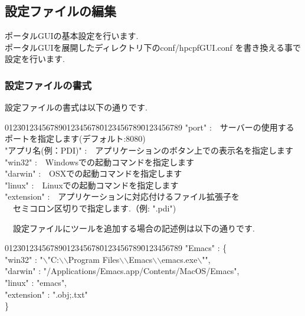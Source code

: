 \documentclass[a4paper,10pt,oneside]{jsbook}
\begin{document}
\newpage

\subsection{設定ファイルの編集}
\label{sec:editconfig}
ポータルGUIの基本設定を行います.\\
ポータルGUIを展開したディレクトリ下のconf/hpcpfGUI.conf
を書き換える事で設定を行います.\\

\subsubsection{設定ファイルの書式}
設定ファイルの書式は以下の通りです.
\label{sec:editconfig_format}
\begin{tabbing}
0123\=0123456789012345678\=0123456789\=0123456789\kill
\> "port"     \>:\ \ サーバーの使用するポートを指定します(デフォルト:8080)\\
\> "アプリ名(例：PDI)" \>:\ \ アプリケーションのボタン上での表示名を指定します\\
\>                 \>"win32" \>:\ \ Windowsでの起動コマンドを指定します\\
\>                 \>"darwin" \>:\ \ OSXでの起動コマンドを指定します\\
\>                 \>"linux" \>:\ \ Linuxでの起動コマンドを指定します\\
\>                 \>"extension" \>:\ \ アプリケーションに対応付けるファイル拡張子を\\
\>                 \>                    \>\  \ セミコロン区切りで指定します.（例: ".pdi")\\
\end{tabbing}

\  \ 設定ファイルにツールを追加する場合の記述例は以下の通りです.
\begin{tabbing}
0123\=0123456789012345678\=0123456789\=0123456789\kill
\> "Emacs" : \{ \\
\> \> "win32"    : "$\backslash$"C:$\backslash$$\backslash$Program Files$\backslash$$\backslash$Emacs$\backslash$$\backslash$emacs.exe$\backslash$"",\\
\> \> "darwin" : "/Applications/Emacs.app/Contents/MacOS/Emacs",\\
\> \> "linux"  : "emacs",\\
\> \> "extension" : ".obj;.txt"\\
\> \}\\
\end{tabbing}
\end{document}
